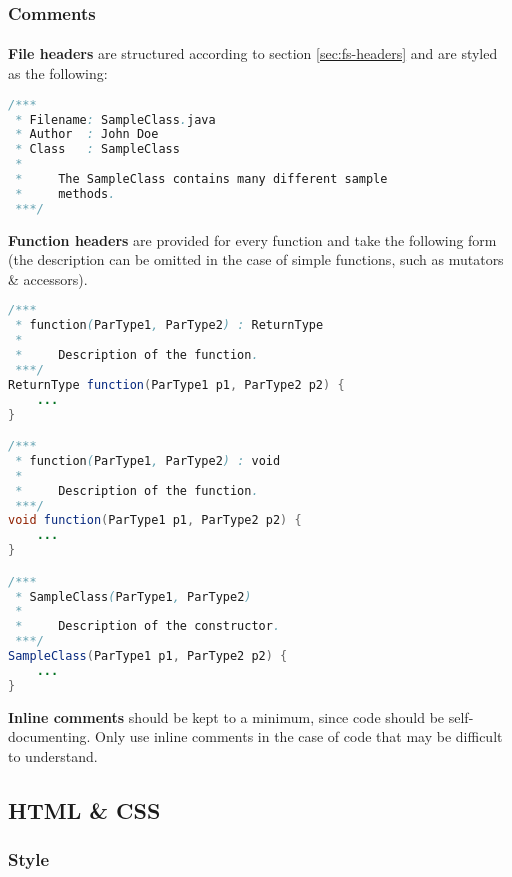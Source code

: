 \documentclass{article}
\begin{document}
    \subsubsection{Comments}
    \label{sec:ls-java-com}

    \paragraph{}
    \textbf{File headers} are structured according to section
    \ref{sec:fs-headers} and are styled as the following:

    \begin{lstlisting}[language=Java]
/***
 * Filename: SampleClass.java
 * Author  : John Doe
 * Class   : SampleClass
 *
 *     The SampleClass contains many different sample
 *     methods.
 ***/
    \end{lstlisting}

    \textbf{Function headers} are provided for every function and take the
    following form (the description can be omitted in the case of simple
    functions, such as mutators \& accessors).

    \begin{lstlisting}[language=Java]
/***
 * function(ParType1, ParType2) : ReturnType
 *
 *     Description of the function.
 ***/
ReturnType function(ParType1 p1, ParType2 p2) {
    ...
}

/***
 * function(ParType1, ParType2) : void
 *
 *     Description of the function.
 ***/
void function(ParType1 p1, ParType2 p2) {
    ...
}

/***
 * SampleClass(ParType1, ParType2)
 *
 *     Description of the constructor.
 ***/
SampleClass(ParType1 p1, ParType2 p2) {
    ...
}
    \end{lstlisting}

    \textbf{Inline comments} should be kept to a minimum, since code should be
    self-documenting. Only use inline comments in the case of code that may be
    difficult to understand.

    \subsection{HTML \& CSS}
    \label{sec:ls-html}

    \subsubsection{Style}
    \label{sec:ls-html-st}
\end{document}
